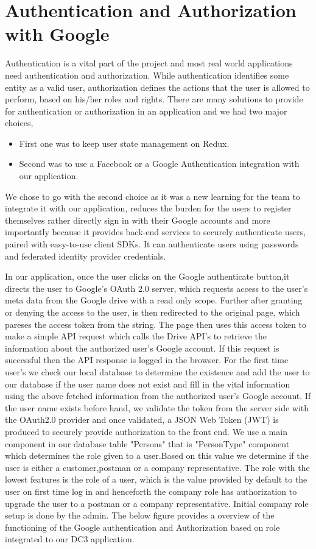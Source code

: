 \section{Authentication and Authorization with Google}

Authentication is a vital part of the project and most real world applications need authentication and authorization. While authentication identifies some entity as a valid user, authorization defines the actions that the user is allowed to perform, based on his/her roles and rights. There are many solutions to provide for authentication or authorization in an application and we had two major choices,

\begin{itemize}
\item First one was to keep user state management on Redux.
\item Second was to use a Facebook or a Google Authentication integration with our application.
\end{itemize}

We chose to go with the second choice as it was a new learning for the team to integrate it with our application, reduces the burden for the users to register themselves rather directly sign in with their Google accounts and more importantly because it provides back-end services to securely authenticate users, paired with easy-to-use client SDKs. It can authenticate users using passwords and federated identity provider credentials. 

In our application, once the user clicks on the Google authenticate button,it directs the user to Google's OAuth 2.0 server, which requests access to the user's meta data from the Google drive with a read only scope. Further after granting or denying the access to the user, is then redirected to the original page, which pareses the access token from the string. The page then uses this access token to make  a simple API request which calls the Drive API's to retrieve the information about the authorized user's Google account. If this request is successful then the API response is logged in the browser.
For the first time user's we check our local database to determine the existence and add the user to our database if the user name does not exist and fill in the vital information using the above fetched information from the authorized user's Google account. If the user name exists before hand, we validate the token from the server side with the OAuth2.0 provider and once validated, a JSON Web Token (JWT)  is produced to securely provide authorization to the front end.
We use a main component in our database table "Persons" that is "PersonType" component which determines the role given to a user.Based on this value we determine if the user is either a customer,postman or a company representative. The role with the lowest features is the role of a user, which is the value provided by default to the user on first time log in and henceforth the company role has  authorization to upgrade the user to a postman or a company representative. Initial company role setup is done by the admin. The below figure provides a overview of the functioning of the Google authentication and Authorization based on role integrated to our DC3 application.

